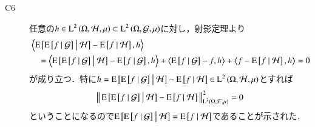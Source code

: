 \begin{prf}
\begin{description}
			\item[C6] 任意の$h \in \Lp{2}{\Omega, \mathcal{H},\mu} \subset \Lp{2}{\Omega, \mathcal{G},\mu}$に対し，射影定理より
				\begin{align}
					&\inprod<\cexp{\cexp{f}{\mathcal{G}}}{\mathcal{H}} - \cexp{f}{\mathcal{H}}, h> \\
					&\quad = \inprod<\cexp{\cexp{f}{\mathcal{G}}}{\mathcal{H}} - \cexp{f}{\mathcal{G}}, h>
						+ \inprod<\cexp{f}{\mathcal{G}} - f, h> + \inprod<f - \cexp{f}{\mathcal{H}}, h>
					= 0
				\end{align}
				が成り立つ．特に$h = \cexp{\cexp{f}{\mathcal{G}}}{\mathcal{H}} - \cexp{f}{\mathcal{H}} \in \Lp{2}{\Omega, \mathcal{H},\mu}$とすれば
				\begin{align}
					\Norm{\cexp{\cexp{f}{\mathcal{G}}}{\mathcal{H}} - \cexp{f}{\mathcal{H}}}{\Lp{2}{\Omega, \mathcal{F},\mu}}^2 = 0
				\end{align}
				ということになるので$\cexp{\cexp{f}{\mathcal{G}}}{\mathcal{H}} = \cexp{f}{\mathcal{H}}$であることが示された.
		\end{description}
		\QED
	\end{prf}